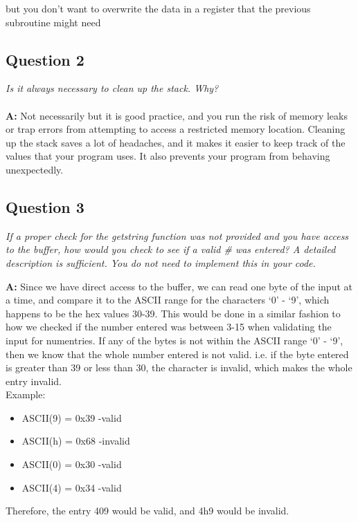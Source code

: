 \documentclass[letterpaper]{article}
\begin{document}
      but you don't want to overwrite the data in a register that the previous subroutine might need
    \subsection{Question 2}
      \textit{Is it always necessary to clean up the stack. Why?}
      \\ \\
      \noindent\textbf{A:}
      Not necessarily but it is good practice, and you run the risk of memory leaks
      or trap errors from attempting to access a restricted memory location.
      Cleaning up the stack saves a lot of headaches, and it makes it easier to keep
      track of the values that your program uses. It also prevents
      your program from behaving unexpectedly.

      \subsection{Question 3} \textit{If a proper check for the getstring
      function was not provided and you have access to the buffer, how would you
      check to see if a valid \# was entered? A detailed description is
      sufficient. You do not need to implement this in your code.
    }

      \noindent\textbf{A:}
      Since we have direct access to the buffer, we can read one byte of the input at a time,
      and compare it to the ASCII range for the characters `0' - `9', which happens to be
      the hex values 30-39. This would be done in a similar fashion to how we checked
      if the number entered was between 3-15 when validating the input for numentries.
      If any of the bytes is not within the ASCII range `0' - `9', then we
      know that the whole number entered is not valid. i.e. if the byte entered
      is greater than 39 or less than 30, the character is invalid, which makes the whole
      entry invalid. \\
      Example:
      \begin{itemize}
        \item ASCII(9) = 0x39 -valid
        \item ASCII(h) = 0x68 -invalid
        \item ASCII(0) = 0x30 -valid
        \item ASCII(4) = 0x34 -valid
      \end{itemize}
      Therefore, the entry 409 would be valid, and 4h9 would be invalid.
\end{document}
